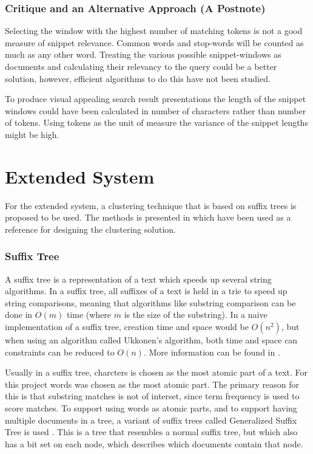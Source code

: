 \subsubsection{Critique and an Alternative Approach (A Postnote)}
Selecting the window with the highest number of matching tokens is not a good measure of snippet relevance. Common words and stop-words will be counted as much as any other word. Treating the various possible snippet-windows as documents and calculating their relevancy to the query could be a better solution, however, efficient algorithms to do this have not been studied. 

To produce visual appealing search result presentations the length of the snippet windows could have been calculated in number of characters rather than number of tokens. Using tokens as the unit of measure the variance of the snippet lengths might be high. 

\section{Extended System}
For the extended system,  a clustering technique that is based on suffix trees is proposed to be used. The methods is presented in \cite{zamir} which have been used as a reference for designing the clustering solution.

\subsubsection{Suffix Tree} 
A suffix tree is a representation of a text which speeds up several string algorithms. In a suffix tree, all suffixes of a text is held in  a trie to speed up string comparisons, meaning that algorithms like substring comparison can be done in $O(m)$ time (where $m$ is the size of the substring). In a naive implementation of a suffix tree, creation time and space would be $O(n^2)$, but when using an algorithm called Ukkonen's algorithm, both time and space can constraints can be reduced to $O(n)$. More information can be found in \cite{suffixtreebook}.

Usually in a suffix tree, charcters is chosen as the most atomic part of a text. For this project words was chosen as the most atomic part. The primary reason for this is that substring matches is not of interset, since term frequency is used to score matches. To support using words as atomic parts, and to support having multiple documents in a tree, a variant of suffix trees called Generalized Suffix Tree is used . This is a tree that resembles a normal suffix tree, but which also has a bit set on each node, which describes which documents contain that node. 

